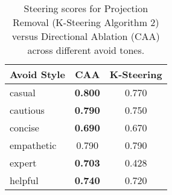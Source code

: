 \begin{table}[H]
\centering
\begin{tabular}{lcc}
\toprule
\textbf{Avoid Style} & \textbf{CAA} & \textbf{K-Steering} \\
\midrule
casual & \textbf{0.800} & 0.770 \\
cautious & \textbf{0.790} & 0.750 \\
concise & \textbf{0.690} & 0.670 \\
empathetic & 0.790 & 0.790 \\
expert & \textbf{0.703} & 0.428 \\
helpful & \textbf{0.740} & 0.720 \\
\bottomrule
\end{tabular}
\caption{Steering scores for Projection Removal (K-Steering Algorithm 2) versus Directional Ablation (CAA) across different avoid tones.}
\end{table}